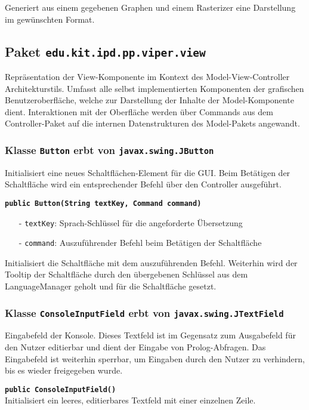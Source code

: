 \documentclass[parskip=full,11pt,twoside]{scrartcl}
\begin{document}
Generiert aus einem gegebenen Graphen und einem Rasterizer eine Darstellung im gewünschten Format.

\subsection{Paket \texttt{edu.kit.ipd.pp.viper.view}}

Repräsentation der View-Komponente im Kontext des Model-View-Controller Architekturstils. Umfasst alle selbst implementierten Komponenten der grafischen Benutzeroberfläche, welche zur Darstellung der Inhalte der Model-Komponente dient. Interaktionen mit der Oberfläche werden über Commands aus dem Controller-Paket auf die internen Datenstrukturen des Model-Pakets angewandt.

\subsubsection{Klasse \texttt{Button} erbt von \texttt{javax.swing.JButton}}

Initialisiert eine neues Schaltflächen-Element für die GUI. Beim Betätigen der Schaltfläche wird ein entsprechender Befehl über den Controller ausgeführt.

\textbf{\texttt{public Button(String textKey, Command command)}}
\begin{itemize}[noitemsep]
	\item[-] \texttt{textKey}: Sprach-Schlüssel für die angeforderte Übersetzung
	\item[-] \texttt{command}: Auszuführender Befehl beim Betätigen der Schaltfläche
\end{itemize}
Initialisiert die Schaltfläche mit dem auszuführenden Befehl. Weiterhin wird der Tooltip der Schaltfläche durch den übergebenen Schlüssel aus dem LanguageManager geholt und für die Schaltfläche gesetzt.

\subsubsection{Klasse \texttt{ConsoleInputField} erbt von \texttt{javax.swing.JTextField}}

Eingabefeld der Konsole. Dieses Textfeld ist im Gegensatz zum Ausgabefeld für den Nutzer editierbar und dient der Eingabe von Prolog-Abfragen. Das Eingabefeld ist weiterhin sperrbar, um Eingaben durch den Nutzer zu verhindern, bis es wieder freigegeben wurde.

\textbf{\texttt{public ConsoleInputField()}}\\
Initialisiert ein leeres, editierbares Textfeld mit einer einzelnen Zeile.
\end{document}
